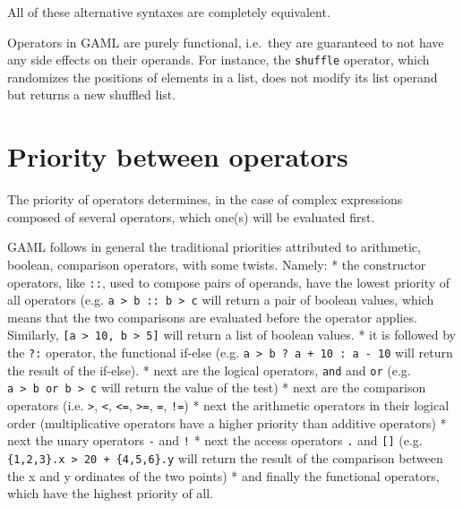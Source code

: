 \documentclass[]{book}
\theoremstyle{definition}
\theoremstyle{definition}
\theoremstyle{definition}
\theoremstyle{remark}
\begin{document}
All of these alternative syntaxes are completely equivalent.

Operators in GAML are purely functional, i.e.~they are guaranteed to not
have any side effects on their operands. For instance, the
\texttt{shuffle} operator, which randomizes the positions of elements in
a list, does not modify its list operand but returns a new shuffled
list.

\section{\texorpdfstring{}{ }}\label{section-21}

\section{Priority between operators}\label{priority-between-operators-3}

The priority of operators determines, in the case of complex expressions
composed of several operators, which one(s) will be evaluated first.

GAML follows in general the traditional priorities attributed to
arithmetic, boolean, comparison operators, with some twists. Namely: *
the constructor operators, like \texttt{::}, used to compose pairs of
operands, have the lowest priority of all operators (e.g.
\texttt{a\ \textgreater{}\ b\ ::\ b\ \textgreater{}\ c} will return a
pair of boolean values, which means that the two comparisons are
evaluated before the operator applies. Similarly,
\texttt{{[}a\ \textgreater{}\ 10,\ b\ \textgreater{}\ 5{]}} will return
a list of boolean values. * it is followed by the \texttt{?:} operator,
the functional if-else (e.g.
\texttt{a\ \textgreater{}\ b\ ?\ a\ +\ 10\ :\ a\ -\ 10} will return the
result of the if-else). * next are the logical operators, \texttt{and}
and \texttt{or} (e.g.
\texttt{a\ \textgreater{}\ b\ or\ b\ \textgreater{}\ c} will return the
value of the test) * next are the comparison operators (i.e.
\texttt{\textgreater{}}, \texttt{\textless{}}, \texttt{\textless{}=},
\texttt{\textgreater{}=}, \texttt{=}, \texttt{!=}) * next the arithmetic
operators in their logical order (multiplicative operators have a higher
priority than additive operators) * next the unary operators \texttt{-}
and \texttt{!} * next the access operators \texttt{.} and
\texttt{{[}{]}} (e.g.
\texttt{\{1,2,3\}.x\ \textgreater{}\ 20\ +\ \{4,5,6\}.y} will return the
result of the comparison between the x and y ordinates of the two
points) * and finally the functional operators, which have the highest
priority of all.
\end{document}
